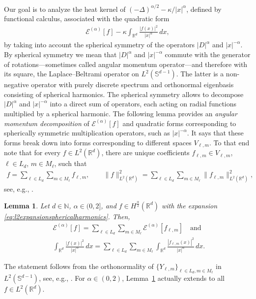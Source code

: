 \documentclass[12pt,reqno]{amsart}
\newtheorem{lemma}[theorem]{Lemma}
\theoremstyle{definition}
\theoremstyle{remark}
\numberwithin{equation}{section}
\newcommand{\1}{\mathbbm{1}}
\newcommand{\N}{\mathbb{N}}
\newcommand{\R}{\mathbb{R}}
\def\bs{\mathbb{S}}
\def\ce{\mathcal{E}}
\begin{document}
Our goal is to analyze the heat kernel of $(-\Delta)^{\alpha/2}-\kappa/|x|^\alpha$, defined by functional calculus, associated with the quadratic form
\begin{align}
  \label{eq:defhardyop}
  \ce^{(\alpha)}[f] - \kappa \int_{\R^d}\frac{|f(x)|^2}{|x|^\alpha}\,dx,
\end{align}
by taking into account the spherical symmetry of the operators $|D|^\alpha$ and $|x|^{-\alpha}$. By spherical symmetry we mean that $|D|^\alpha$ and $|x|^{-\alpha}$ commute with the generator of rotations---sometimes called angular momentum operator---and therefore with its square, the Laplace--Beltrami operator on $L^2(\bs^{d-1})$. The latter is a non-negative operator with purely discrete spectrum and orthonormal eigenbasis consisting of spherical harmonics. The spherical symmetry allows to decompose $|D|^\alpha$ and $|x|^{-\alpha}$ into a direct sum of operators, each acting on radial functions multiplied by a spherical harmonic.
%
The following lemma provides an \emph{angular momentum decomposition} of $\ce^{(\alpha)}[f]$ and quadratic forms corresponding to spherically symmetric multiplication operators, such as $|x|^{-\alpha}$. It says that these forms break down into forms corresponding to different spaces $V_{\ell,m}$. To that end note that for every $f\in L^2(\R^d)$, there are unique coefficients $f_{\ell,m}\in V_{\ell,m}$, $\ell\in L_d$, $m\in M_\ell$, such that
\begin{align}
  \label{eq:l2expansionsphericalharmonics}
  f = \sum_{\ell\in L_d}\sum_{m\in M_\ell}f_{\ell,m}, \qquad
  \|f\|_{L^2(\R^d)}^2 = \sum_{\ell\in L_d}\sum_{m\in M_\ell}\|f_{\ell,m}\|_{L^2(\R^d)}^2,
\end{align}
see, e.g., \cite{BogdanMerz2024,Kalf1995}.

\begin{lemma}
  \label{fourierbesselcor}
  Let $d\!\in\!\N$, $\alpha\!\in\!(0,2]$, and $f\!\in\! H^{\frac\alpha2}(\R^d)$ with the expansion \eqref{eq:l2expansionsphericalharmonics}. Then,
  \begin{subequations}
    \begin{align}
      & \ce^{(\alpha)}[f] = \sum_{\ell\in L_d}\sum_{m\in M_\ell}\ce^{(\alpha)}[f_{\ell,m}]
        \quad \text{and} \quad \\
      & \int_{\R^d}\frac{|f(x)|^2}{|x|^\alpha}\,dx
        = \sum_{\ell\in L_d}\sum_{m\in M_\ell}\int_{\R^d}\frac{|f_{\ell,m}(x)|^2}{|x|^\alpha}\,dx.
    \end{align}
  \end{subequations}
\end{lemma}
The statement follows from the orthonormality of $\{Y_{\ell,m}\}_{\ell\in L_d,m\in M_\ell}$ in $L^2(\bs^{d-1})$, see, e.g., \cite[Lemma~1.2]{BogdanMerz2024}. For $\alpha\in(0,2)$, Lemma~\ref{fourierbesselcor} actually extends to all $f\in L^2(\R^d)$.
\end{document}
